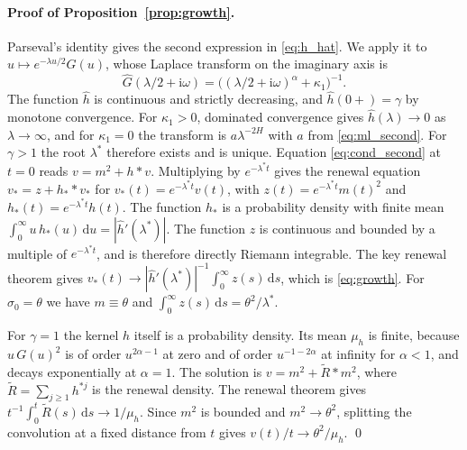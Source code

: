 \documentclass[11pt,a4paper]{article}
\theoremstyle{definition}
\newcommand{\D}{\mathrm{d}}
\begin{document}
\paragraph{Proof of Proposition~\ref{prop:growth}.} Parseval's identity gives the second expression in \eqref{eq:h_hat}. We apply it to $u\mapsto e^{-\lambda u/2}G(u)$, whose Laplace transform on the imaginary axis is
\begin{equation*}
\widehat G(\lambda/2+\mathrm{i}\omega)=\big((\lambda/2+\mathrm{i}\omega)^\alpha+\kappa_1\big)^{-1}.
\end{equation*}
The function $\widehat h$ is continuous and strictly decreasing, and $\widehat h(0+)=\gamma$ by monotone convergence. For $\kappa_1>0$, dominated convergence gives $\widehat h(\lambda)\to0$ as $\lambda\to\infty$, and for $\kappa_1=0$ the transform is $a\lambda^{-2H}$ with $a$ from \eqref{eq:ml_second}. For $\gamma>1$ the root $\lambda^*$ therefore exists and is unique. Equation \eqref{eq:cond_second} at $t=0$ reads $v=m^2+h*v$. Multiplying by $e^{-\lambda^*t}$ gives the renewal equation $v_\ast=z+h_\ast*v_\ast$ for $v_\ast(t)=e^{-\lambda^*t}v(t)$, with $z(t)=e^{-\lambda^*t}m(t)^2$ and $h_\ast(t)=e^{-\lambda^*t}h(t)$. The function $h_\ast$ is a probability density with finite mean $\int_0^\infty u\,h_\ast(u)\,\D u=|\widehat h'(\lambda^*)|$. The function $z$ is continuous and bounded by a multiple of $e^{-\lambda^*t}$, and is therefore directly Riemann integrable. The key renewal theorem \citep[Chapter~XI]{Feller1971} gives $v_\ast(t)\to|\widehat h'(\lambda^*)|^{-1}\int_0^\infty z(s)\,\D s$, which is \eqref{eq:growth}. For $\sigma_0=\theta$ we have $m\equiv\theta$ and $\int_0^\infty z(s)\,\D s=\theta^2/\lambda^*$.

For $\gamma=1$ the kernel $h$ itself is a probability density. Its mean $\mu_h$ is finite, because $u\,G(u)^2$ is of order $u^{2\alpha-1}$ at zero and of order $u^{-1-2\alpha}$ at infinity for $\alpha<1$, and decays exponentially at $\alpha=1$. The solution is $v=m^2+\widetilde R*m^2$, where $\widetilde R=\sum_{j\ge1}h^{*j}$ is the renewal density. The renewal theorem gives $t^{-1}\int_0^t\widetilde R(s)\,\D s\to1/\mu_h$. Since $m^2$ is bounded and $m^2\to\theta^2$, splitting the convolution at a fixed distance from $t$ gives $v(t)/t\to\theta^2/\mu_h$. \qed
\end{document}
